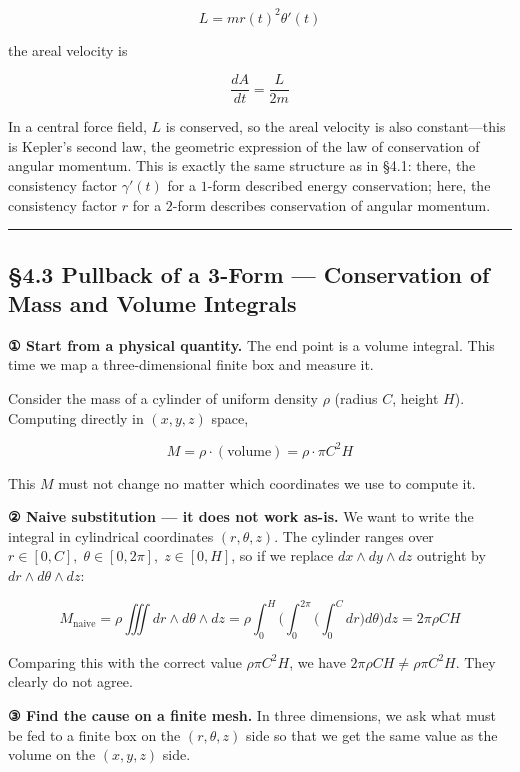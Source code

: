 \[
L
=
m r(t)^2\theta'(t)
\]

the areal velocity is

\[\frac{dA}{dt} = \frac{L}{2m}\]

In a central force field, \(L\) is conserved, so the areal velocity is
also constant---this is Kepler's second law, the geometric expression of
the law of conservation of angular momentum. This is exactly the same
structure as in §4.1: there, the consistency factor \(\gamma'(t)\) for a
\(1\)-form described energy conservation; here, the consistency factor
\(r\) for a \(2\)-form describes conservation of angular momentum.

\begin{center}\rule{0.5\linewidth}{0.5pt}\end{center}

\hypertarget{pullback-of-a-3-form-conservation-of-mass-and-volume-integrals}{%
\subsection{§4.3 Pullback of a 3-Form --- Conservation of Mass and
Volume
Integrals}\label{pullback-of-a-3-form-conservation-of-mass-and-volume-integrals}}

\textbf{① Start from a physical quantity.} The end point is a volume
integral. This time we map a three-dimensional finite box and measure
it.

Consider the mass of a cylinder of uniform density \(\rho\) (radius
\(C\), height \(H\)). Computing directly in \((x,y,z)\) space,

\[M = \rho \cdot (\text{volume}) = \rho \cdot \pi C^2 H\]

This \(M\) must not change no matter which coordinates we use to compute
it.

\textbf{② Naive substitution — it does not work as-is.} We want to write
the integral in cylindrical coordinates \((r,\theta,z)\). The cylinder
ranges over \(r \in [0, C],\; \theta \in [0, 2\pi],\; z \in [0, H]\), so
if we replace \(dx \wedge dy \wedge dz\) outright by
\(dr \wedge d\theta \wedge dz\):

\[
M_{\text{naive}}
=
\rho \iiint dr\wedge d\theta\wedge dz
=
\rho
\int_0^H
\biggl(
  \int_0^{2\pi}
  \biggl(
    \int_0^C dr
  \biggr)
  d\theta
\biggr)
dz
=
2\pi\rho C H
\]

Comparing this with the correct value \(\rho \pi C^2 H\), we have
\(2\pi\rho C H \neq \rho \pi C^2 H\). They clearly do not agree.

\textbf{③ Find the cause on a finite mesh.} In three dimensions, we ask
what must be fed to a finite box on the \((r,\theta,z)\) side so that we
get the same value as the volume on the \((x,y,z)\) side.

